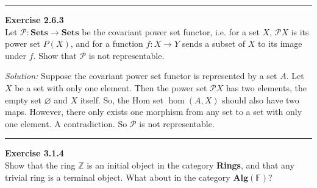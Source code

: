 \documentclass[a4paper, 11pt]{article}
\newenvironment{problem}[2][Exercise]
    { \begin{mdframed}[backgroundcolor=gray!20] \textbf{#1 #2} \\}
    {  \end{mdframed}}
\newenvironment{solution}
    {\textit{Solution:}}
    {}
\begin{document}
\noindent\rule{7in}{2.8pt}
\begin{problem}{2.6.3}
Let \(\mathcal{P}:\textbf{Sets}\rightarrow \textbf{Sets}\) be the covariant power set functor, i.e. for a set \(X\), \(\mathcal{P}X\) is its power 
set \(P(X)\), and for a function \(f:X\rightarrow Y\) sends a subset of \(X\) to its image under \(f\). Show that \(\mathcal{P}\) is not representable.
\end{problem}
\begin{solution}
Suppose the covariant power set functor is represented by a set \(A\). Let \(X\) be a set with only one element. Then the power set \(\mathcal{P}X\) has two elements, the empty set \(\varnothing\) and \(X\) itself. 
So, the Hom set \(\hom(A,X)\) should also have two maps. However, there only exists one morphism from any set to a set with only one element. A contradiction. So \(\mathcal{P}\) is not representable.  
\end{solution}
\\
\noindent\rule{7in}{2.8pt}
\begin{problem}{3.1.4}
Show that the ring \(\mathbb{Z}\) is an initial object in the category \textbf{Rings}, and that any trivial ring is a terminal object. What about in the category \(\textbf{Alg}(\mathbb{F})\)?
\end{problem}
\end{document}

